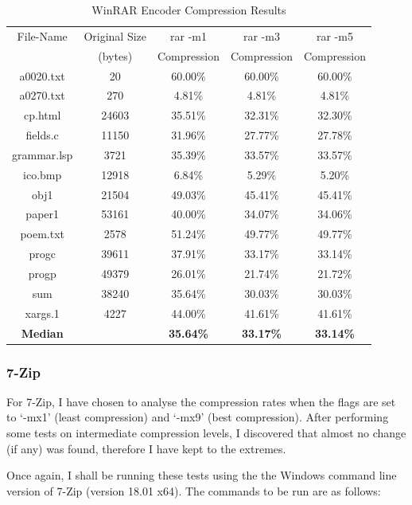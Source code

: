 \documentclass[12pt]{article}
\begin{document}
\begin{table}[H]
	\centering
	\begin{tabular}{| c | c | c | c | c |} 
		\hline
		File-Name & Original Size & rar -m1 & rar -m3 & rar -m5 \\
		& (bytes) & Compression & Compression & Compression\\
		\hline
		a0020.txt & 20 & 60.00\% & 60.00\% & 60.00\%\\
		\hline
		a0270.txt & 270 & 4.81\% & 4.81\% & 4.81\%\\
		\hline
		cp.html & 24603 & 35.51\% & 32.31\% & 32.30\%\\
		\hline
		fields.c & 11150 & 31.96\% & 27.77\% & 27.78\%\\
		\hline
		grammar.lsp & 3721 & 35.39\% & 33.57\% & 33.57\%\\
		\hline
		ico.bmp & 12918 & 6.84\% & 5.29\% & 5.20\%\\
		\hline
		obj1 & 21504 & 49.03\% & 45.41\% & 45.41\%\\
		\hline
		paper1 & 53161 & 40.00\% & 34.07\% & 34.06\%\\
		\hline
		poem.txt & 2578 & 51.24\% & 49.77\% & 49.77\%\\
		\hline
		progc & 39611 & 37.91\% & 33.17\% & 33.14\%\\
		\hline
		progp & 49379 & 26.01\% & 21.74\% & 21.72\%\\
		\hline
		sum & 38240 & 35.64\% & 30.03\% & 30.03\%\\
		\hline
		xargs.1 & 4227 & 44.00\% & 41.61\% & 41.61\%\\
		\Xhline{3\arrayrulewidth}
		\textbf{Median} & & \textbf{35.64\%} & \textbf{33.17\%} & \textbf{33.14\%}\\
		\hline
	\end{tabular}
	\caption{WinRAR Encoder Compression Results}
	\label{winrar_results_compression}
\end{table}

\subsubsection{7-Zip}
For 7-Zip, I have chosen to analyse the compression rates when the flags are set to `-mx1' (least compression) and `-mx9' (best compression). After performing some tests on intermediate compression levels, I discovered that almost no change (if any) was found, therefore I have kept to the extremes.

Once again, I shall be running these tests using the the Windows command line version of 7-Zip (version 18.01 x64). The commands to be run are as follows:
\end{document}
